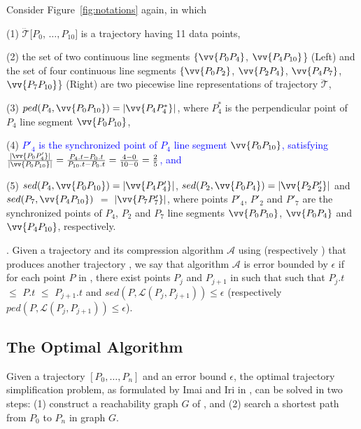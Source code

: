 \begin{example}
\label{exm-notations}
Consider Figure~\ref{fig:notations} again, in which

\sstab(1) $\dddot{\mathcal{T}}[P_0$, $\ldots, P_{10}]$ is a trajectory having 11 data points,

\sstab(2) the set of two continuous line segments $\{\vv{P_0P_4}$, $\vv{P_4P_{10}}$\} (Left) and the set of four continuous line segments $\{\vv{P_0P_2}$, $\vv{P_2P_4}$, $\vv{P_4P_7}$, $\vv{P_7P_{10}}$\} (Right) are two piecewise line representations of trajectory $\dddot{\mathcal{T}}$,

\sstab(3) $ped(P_4, \vv{P_0P_{10}})=|\vv{P_4P^*_4}|$, where $P^*_4$ is the perpendicular point of $P_4$ \wrt line segment $\vv{P_0P_{10}}$,

\sstab(4) \textcolor{blue}{$P'_4$ is the synchronized point of $P_4$ \wrt line segment $\vv{P_0P_{10}}$, satisfying $\frac{|\vv{P_0P'_4}|}{|\vv{P_0P_{10}}|} = \frac{P_4.t - P_0.t}{P_{10}.t-P_0.t} = \frac{4-0}{10-0}= \frac{2}{5}$, and}

\sstab(5) $sed(P_4, \vv{P_0P_{10}})= |\vv{P_4P'_4}|$, $sed(P_2, \vv{P_0P_{4}})= |\vv{P_2P'_2}|$ and $sed(P_7, \vv{P_4P_{10}})$ $=$ $|\vv{P_7P'_7}|$,
where points $P'_4$, $P'_2$ and $P'_7$ are the synchronized points of $P_4$, $P_2$ and $P_7$ \wrt line segments $\vv{P_0P_{10}}$, $\vv{P_0P_{4}}$ and $\vv{P_4P_{10}}$, respectively. \eop
\end{example}

. Given a trajectory  and its compression  algorithm $\mathcal{A}$ using \sed (respectively \ped) that produces another trajectory ,
we say that algorithm $\mathcal{A}$ is error bounded by $\epsilon$ if  for each point $P$ in , there exist points $P_j$ and $P_{j+1}$ in  such that such that $P_j.t$ $\le$ $P.t$ $\le$ $P_{j+1}.t$ and $sed(P, \mathcal{L}(P_j,P_{j+1}))\le \epsilon$ (respectively $ped(P, \mathcal{L}(P_j,P_{j+1}))\le \epsilon$).



\subsection{The Optimal \lsa Algorithm}
\label{subsec-optimal}

Given a trajectory ${[P_0, \ldots, P_n]}$ and an error bound $\epsilon$, the optimal trajectory simplification problem, as formulated by Imai and Iri in \cite{Imai:Optimal}, can be solved in two steps: (1) construct a reachability graph $G$ of , and (2) search a shortest path from $P_0$ to $P_{n}$ in graph $G$.

